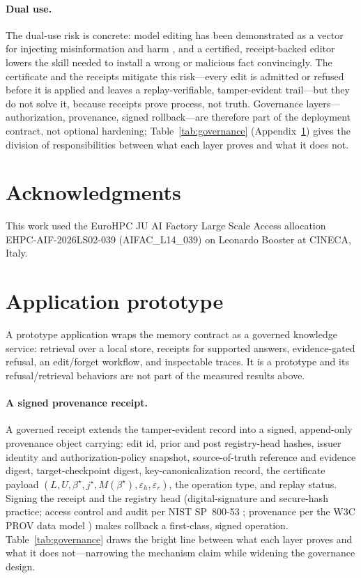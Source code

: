 \documentclass[11pt]{article}
\theoremstyle{remark}
\begin{document}
\paragraph{Dual use.} The dual-use risk is concrete: model editing has been
demonstrated as a vector for injecting misinformation and harm
\citep{chen2024injectharm}, and a certified, receipt-backed editor lowers the
skill needed to install a wrong or malicious fact convincingly. The certificate
and the receipts mitigate this risk---every edit is admitted or refused before
it is applied and leaves a replay-verifiable, tamper-evident trail---but they
do not solve it, because receipts prove process, not truth. Governance
layers---authorization, provenance, signed rollback---are therefore part of the
deployment contract, not optional hardening; Table~\ref{tab:governance}
(Appendix~\ref{app:prototype}) gives the division of responsibilities between what each layer
proves and what it does not.

\section*{Acknowledgments}
This work used the EuroHPC JU AI Factory Large Scale Access allocation
EHPC-AIF-2026LS02-039 (AIFAC\_L14\_039) on Leonardo Booster at CINECA, Italy.

\appendix
\section{Application prototype}\label{app:prototype}
A prototype application wraps the memory contract as a governed knowledge service:
retrieval over a local store, receipts for supported answers, evidence-gated
refusal, an edit/forget workflow, and inspectable traces. It is a prototype and
its refusal/retrieval behaviors are not part of the measured results above.

\paragraph{A signed provenance receipt.} A governed receipt extends the
tamper-evident record into a signed, append-only provenance object carrying: edit
id, prior and post registry-head hashes, issuer identity and authorization-policy
snapshot, source-of-truth reference and evidence digest, target-checkpoint digest,
key-canonicalization record, the certificate payload
$(L,U,\beta^{\star},j^{\star},M(\beta^{\star}),\varepsilon_h,\varepsilon_r)$, the
operation type, and replay status. Signing the receipt and the registry head
(digital-signature and secure-hash practice; access control and audit per NIST
SP~800-53 \citep{nist80053}; provenance per the W3C PROV data model
\citep{w3cprovdm}) makes rollback a first-class, signed operation.
Table~\ref{tab:governance} draws the bright line between what each layer proves and
what it does not---narrowing the mechanism claim while widening the governance
design.
\end{document}
